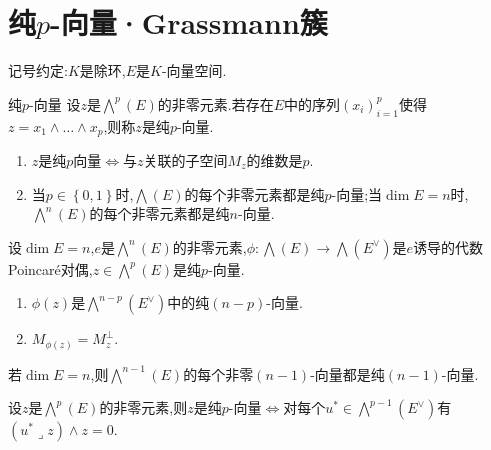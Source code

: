 \section{纯\texorpdfstring{$p$}{p}-向量·Grassmann簇}

记号约定:$K$是除环,$E$是$K$-向量空间.

\begin{definition}{纯$p$-向量}{}
	设$z$是$\bigwedge\limits^{p}\left(E\right)$的非零元素.若存在$E$中的序列$\left(x_{i}\right)_{i=1}^{p}$使得$z=x_{1}\wedge\ldots\wedge x_{p}$,则称$z$是纯$p$-向量.
\end{definition}

\begin{remark}{}{}
	\begin{enumerate}
		\item $z$是纯$p$向量$\iff$与$z$关联的子空间$M_{z}$的维数是$p$.
		\item 当$p\in\left\{0,1\right\}$时,$\bigwedge\left(E\right)$的每个非零元素都是纯$p$-向量;当$\dim E=n$时,$\bigwedge\limits^{n}\left(E\right)$的每个非零元素都是纯$n$-向量.
	\end{enumerate}
\end{remark}

\begin{proposition}{}{}
	设$\dim E=n$,$e$是$\bigwedge\limits^{n}\left(E\right)$的非零元素,$\phi:\bigwedge\left(E\right)\to\bigwedge\left(E^{\vee}\right)$是$e$诱导的代数Poincar\'{e}对偶,$z\in\bigwedge\limits^{p}\left(E\right)$是纯$p$-向量.
	\begin{enumerate}
		\item $\phi\left(z\right)$是$\bigwedge\limits^{n-p}\left(E^{\vee}\right)$中的纯$\left(n-p\right)$-向量.
		\item $M_{\phi\left(z\right)}=M_{z}^{\perp}$.
	\end{enumerate}
\end{proposition}

\begin{corollary}{}{}
	若$\dim E=n$,则$\bigwedge\limits^{n-1}\left(E\right)$的每个非零$\left(n-1\right)$-向量都是纯$\left(n-1\right)$-向量.
\end{corollary}

\begin{proposition}{}{}
	设$z$是$\bigwedge\limits^{p}\left(E\right)$的非零元素,则$z$是纯$p$-向量$\iff$对每个$u^{\ast}\in\bigwedge\limits^{p-1}\left(E^{\vee}\right)$有$\left(u^{\ast}\lrcorner z\right)\wedge z=0$.
\end{proposition}

